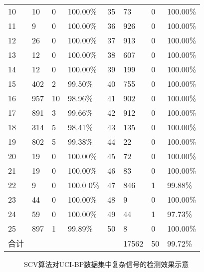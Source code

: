 {\begin{center}
\begin{longtable}{m{1.5cm}<{\centering}m{1.5cm}<{\centering}m{1.5cm}<{\centering}m{1.5cm}<{\centering}m{1.5cm}<{\centering}m{1.5cm}<{\centering}m{1.5cm}<{\centering}m{1.5cm}<{\centering}}
        10	&   10	    &0	    &100.00\% 	    &35     &	73   &0     &100.00\%   \\
        11	&   9       &0      &100.00\%       &36	    &   926  &0	    &100.00\%   \\
        12	&   26	    &0	    &100.00\% 	    &37     &	913  &0	    &100.00\%   \\
        13	&   12	    &0	    &100.00\% 	    &38     &	607  &0 	&100.00\%   \\
        14	&   12	    &0	    &100.00\% 	    &39     &	199  &0	    &100.00\%   \\
        15	&   402 	&2	    &99.50\%	    &40	    &   755  &0     &100.00\%   \\
        16	&   957 	&10 	&98.96\%  	    &41     &	902  &0	    &100.00\%   \\
        17	&   891 	&3	    &99.66\%	    &42	    &   912  &0     &100.00\%   \\
        18	&   314 	&5	    &98.41\%	    &43	    &   135  &0     &100.00\%   \\
        19	&   802 	&5	    &99.38\%	    &44	    &   22	 &0	    &100.00\%   \\
        20	&   19	    &0	    &100.00\% 	    &45     &	72   &0     &100.00\%   \\
        21	&   19	    &0	    &100.00\% 	    &46     &	83   &0     &100.00\%   \\
        22	&   9	    &0      &100.0 0\%	    &47	    &   846  &1	    &99.88\%    \\
        23	&   44	    &0	    &100.00\% 	    &48     &	9	 &0	    &100.00\%   \\
        24	&   59	    &0	    &100.00\% 	    &49     &	44   &1     &97.73\%    \\
        25	&   897 	&1	    &99.89\%	    &50	    &   8	 &0     &100.00\%   \\
        合计&           &       &               &       &   17562&50    &99.72\%    \\
	\end{longtable}
\end{center}
\begin{figure}[htbp]
    \centering
    \quad
    \quad
    \quad
    \caption{\label{fig:ucibp_detect_details}SCV算法对UCI-BP数据集中复杂信号的检测效果示意}
\end{figure}

}
